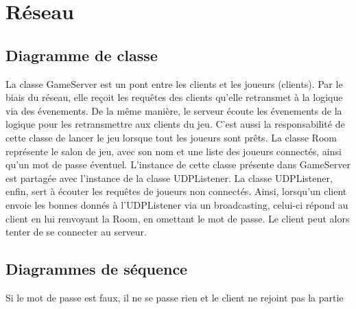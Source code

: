 \chapter{Réseau} \label{chapter:reseau}

    \section{Diagramme de classe}


        La classe GameServer est un pont entre les clients et les joueurs (clients).
        Par le biais du réseau, elle reçoit les requêtes des clients qu'elle
        retransmet à la logique via des évenements. De la même manière,
        le serveur écoute les évenements de la logique pour les retransmettre
        aux clients du jeu. C'est aussi la responsabilité de cette classe de
        lancer le jeu lorsque tout les joueurs sont prêts.
        \newline
        La classe Room représente le salon de jeu, avec son nom et une liste
        des joueurs connectés, ainsi qu'un mot de passe éventuel. L'instance
        de cette classe présente dans GameServer est partagée avec l'instance
        de la classe UDPListener.
        \newline
        La classe UDPListener, enfin, sert à écouter les requêtes de joueurs
        non connectés. Ainsi, lorsqu'un client envoie les bonnes donnés à
        l'UDPListener via un broadcasting, celui-ci répond au client en lui
        renvoyant la Room, en omettant le mot de passe. Le client peut alors
        tenter de se connecter au serveur.

    \section{Diagrammes de séquence}


        Si le mot de passe est faux, il ne se passe rien et le client ne rejoint pas la partie